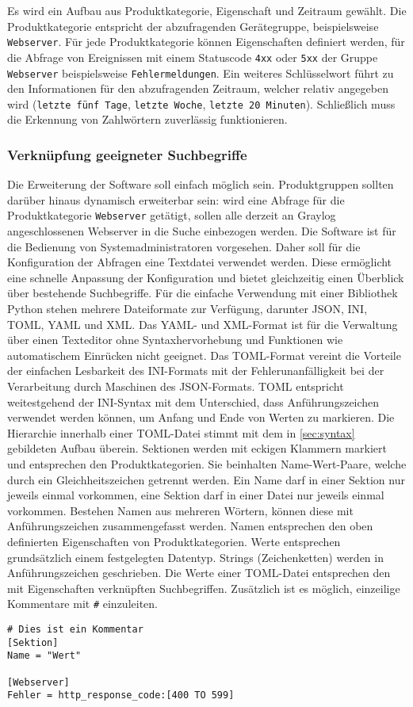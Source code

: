 Es wird ein Aufbau aus Produktkategorie, Eigenschaft und Zeitraum gewählt. Die Produktkategorie entspricht der abzufragenden Gerätegruppe, beispielsweise \lstinline{Webserver}. Für jede Produktkategorie können Eigenschaften definiert werden, für die Abfrage von Ereignissen mit einem Statuscode \lstinline{4xx} oder \lstinline{5xx} der Gruppe \lstinline{Webserver} beispielsweise \lstinline{Fehlermeldungen}. Ein weiteres Schlüsselwort führt zu den Informationen für den abzufragenden Zeitraum, welcher relativ angegeben wird (\lstinline{letzte fünf Tage}, \lstinline{letzte Woche}, \lstinline{letzte 20 Minuten}). Schließlich muss die Erkennung von Zahlwörtern zuverlässig funktionieren.

\subsubsection{Verknüpfung geeigneter Suchbegriffe}

Die Erweiterung der Software soll einfach möglich sein. Produktgruppen sollten darüber hinaus dynamisch erweiterbar sein: wird eine Abfrage für die Produktkategorie \lstinline{Webserver} getätigt, sollen alle derzeit an Graylog angeschlossenen Webserver in die Suche einbezogen werden. Die Software ist für die Bedienung von Systemadministratoren vorgesehen. Daher soll für die Konfiguration der Abfragen eine Textdatei verwendet werden. Diese ermöglicht eine schnelle Anpassung der Konfiguration und bietet gleichzeitig einen Überblick über bestehende Suchbegriffe. Für die einfache Verwendung mit einer Bibliothek Python stehen mehrere Dateiformate zur Verfügung, darunter JSON, INI, TOML, YAML und XML. Das YAML- und XML-Format ist für die Verwaltung über einen Texteditor ohne Syntaxhervorhebung und Funktionen wie automatischem Einrücken nicht geeignet. Das TOML-Format vereint die Vorteile der einfachen Lesbarkeit des INI-Formats mit der Fehlerunanfälligkeit bei der Verarbeitung durch Maschinen des JSON-Formats. TOML entspricht weitestgehend der INI-Syntax mit dem Unterschied, dass Anführungszeichen verwendet werden können, um Anfang und Ende von Werten zu markieren. Die Hierarchie innerhalb einer TOML-Datei stimmt mit dem in \autoref{sec:syntax} gebildeten Aufbau überein. Sektionen werden mit eckigen Klammern markiert und entsprechen den Produktkategorien. Sie beinhalten Name-Wert-Paare, welche durch ein Gleichheitszeichen getrennt werden. Ein Name darf in einer Sektion nur jeweils einmal vorkommen, eine Sektion darf in einer Datei nur jeweils einmal vorkommen. Bestehen Namen aus mehreren Wörtern, können diese mit Anführungszeichen zusammengefasst werden. Namen entsprechen den oben definierten Eigenschaften von Produktkategorien. Werte entsprechen grundsätzlich einem festgelegten Datentyp. Strings (Zeichenketten) werden in Anführungszeichen geschrieben. Die Werte einer TOML-Datei entsprechen den mit Eigenschaften verknüpften Suchbegriffen. Zusätzlich ist es möglich, einzeilige Kommentare mit \lstinline{#} einzuleiten.

\begin{lstlisting}[caption={Beispiel der TOML-Syntax.}, label=toml-syntax, xleftmargin=6mm]
# Dies ist ein Kommentar
[Sektion]
Name = "Wert"

[Webserver]
Fehler = http_response_code:[400 TO 599] 
\end{lstlisting}
